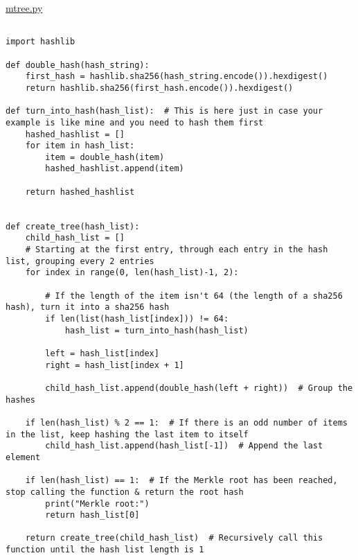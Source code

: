 \begin{linenumbers}
\resetlinenumber[1]
\hypertarget{milp_code}{}
\hyperlink{milp_text}{mtree.py}

\begin{lstlisting}

import hashlib

def double_hash(hash_string):
    first_hash = hashlib.sha256(hash_string.encode()).hexdigest()
    return hashlib.sha256(first_hash.encode()).hexdigest()

def turn_into_hash(hash_list):  # This is here just in case your example is like mine and you need to hash them first
    hashed_hashlist = []
    for item in hash_list:
        item = double_hash(item)
        hashed_hashlist.append(item)

    return hashed_hashlist


def create_tree(hash_list):
    child_hash_list = []
    # Starting at the first entry, through each entry in the hash list, grouping every 2 entries
    for index in range(0, len(hash_list)-1, 2):

        # If the length of the item isn't 64 (the length of a sha256 hash), turn it into a sha256 hash
        if len(list(hash_list[index])) != 64:
            hash_list = turn_into_hash(hash_list)

        left = hash_list[index]
        right = hash_list[index + 1]

        child_hash_list.append(double_hash(left + right))  # Group the hashes

    if len(hash_list) % 2 == 1:  # If there is an odd number of items in the list, keep hashing the last item to itself
        child_hash_list.append(hash_list[-1])  # Append the last element

    if len(hash_list) == 1:  # If the Merkle root has been reached, stop calling the function & return the root hash
        print("Merkle root:")
        return hash_list[0]
   
    return create_tree(child_hash_list)  # Recursively call this function until the hash list length is 1






\end{lstlisting}
\end{linenumbers} 